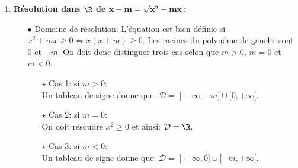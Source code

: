 \begin{correction}
\begin{enumerate}
\begin{itemize}
\item[$\bullet$] On passe tout du m\^{e}me c\^{o}t\'e et on met tout sur le m\^{e}me d\'enominateur. On obtient:
$$\ddp\frac{m+3}{x}=\ddp\frac{2m-1}{x-1}\Leftrightarrow \ddp\frac{(4-m)x -(m+3) }{x(x-1)}=0\Leftrightarrow (4-m)x -(m+3)=0.$$
On doit donc \'etudier des cas:
\begin{itemize}
\item[$\star$] Cas 1: si $m=4$, on obtient: $m+3=0\Leftrightarrow 7=0$. Ainsi 
\item[$\star$] Cas 2: si $m\not=4$, on obtient $x=\ddp\frac{m+3}{4-m}$. Il reste alors \`{a} v\'erifier que ce nombre est bien dans le domaine de r\'esolution, \`{a} savoir que $\ddp\frac{m+3}{4-m}\not= 0$ et $\ddp\frac{m+3}{4-m}\not= 1$.
\begin{itemize}
\item[$\star$] Si $m=-3$ alors $\ddp\frac{m+3}{4-m}=0$ et ainsi 
\item[$\star$] Si $m=\ddp\demi$ alors $\ddp\frac{m+3}{4-m}=1$ et ainsi 
\item[$\star$] Sinon 
\end{itemize}
\end{itemize}
\end{itemize}
\item \textbf{R\'esolution dans $\mathbf{\R}$ de $\mathbf{x-m=\sqrt{x^2+mx}}$:}\\
\begin{itemize} 
\item[$\bullet$] Domaine de r\'esolution: L'\'equation est bien d\'efinie si $x^2+mx\geq 0\Leftrightarrow x(x+m)\geq 0$. Les racines du polyn\^ome de gauche sont $0$ et $-m$. On doit donc distinguer trois cas selon que $m>0$, $m=0$ et $m<0$.
\begin{itemize}
\item[$\star$] Cas 1: si $m>0$:\\
\noindent Un tableau de signe donne que: $\mathcal{D}= \; \rbrack -\infty,-m\rbrack\cup\lbrack 0,+\infty\lbrack$.
\item[$\star$] Cas 2: si $m=0$:\\
\noindent On doit r\'esoudre $x^2\geq 0$ et ainsi: $\mathcal{D}=\R$.
\item[$\star$] Cas 3: si $m<0$:\\
\noindent Un tableau de signe donne que: $\mathcal{D}= \; \rbrack -\infty,0\rbrack\cup\lbrack -m,+\infty\lbrack$.

\end{itemize}
\end{itemize}
\end{enumerate}
\end{correction}
